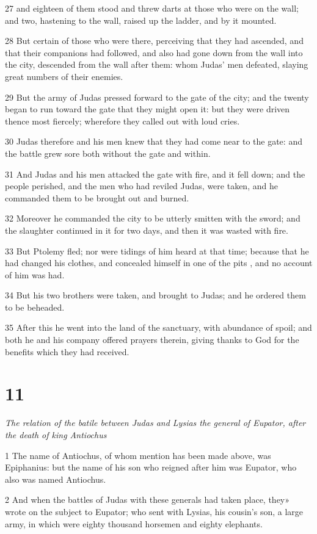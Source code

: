 27 and eighteen of them stood and threw darts at those who were on the wall; and two, hastening to the wall, raised up the ladder, and by it mounted. 

28 But certain of those who were there, perceiving that they had ascended, and that their companions had followed, and also had gone down from the wall into the city, descended from the wall after them: whom Judas’ men defeated, slaying great numbers of their enemies. 

29 But the army of Judas pressed forward to the gate of the city; and the twenty began to run toward the gate that they might open it: but they were driven thence most fiercely; wherefore they called out with loud cries. 

30 Judas therefore and his men knew that they had come near to the gate: and the battle grew sore both without the gate and within. 

31 And Judas and his men attacked the gate with fire, and it fell down; and the people perished, and the men who had reviled Judas, were taken, and he commanded them to be brought out and burned. 

32 Moreover he commanded the city to be utterly smitten with the sword; and the slaughter continued in it for two days, and then it was wasted with fire. 

33 But Ptolemy fled; nor were tidings of him heard at that time; because that he had changed his clothes, and concealed himself in one of the pits , and no account of him was had. 

34 But his two brothers were taken, and brought to Judas; and he ordered them to be beheaded. 

35 After this he went into the land of the sanctuary, with abundance of spoil; and both he and his company offered prayers therein, giving thanks to God for the benefits which they had received. 


\chapter{11}

\par \textit{The relation of the batile between Judas and Lysias the general of Eupator, after the death of king Antiochus}

1 The name of Antiochus, of whom mention has been made above, was Epiphanius: but the name of his son who reigned after him was Eupator, who also was named Antiochus. 

2 And when the battles of Judas with these generals had taken place, they» wrote on the subject to Eupator; who sent with Lysias, his cousin’s son, a large army, in which were eighty thousand horsemen and eighty elephants. 


